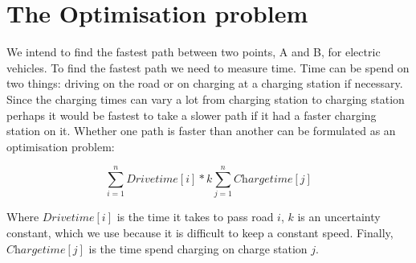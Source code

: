 \section{The Optimisation problem}

We intend to find the fastest path between two points, A and B, for electric vehicles. To find the 
fastest path we need to measure time. Time can be spend on two things: driving on the road or on charging
at a charging station if necessary. Since the charging times can vary a lot from charging station to charging station 
perhaps it would be fastest to take a slower path if it had a faster charging station on it. Whether one path is 
faster than another can be formulated as an optimisation problem:

\[\displaystyle \sum_{i=1}^{n} \textit{Drivetime}[i] * k \displaystyle \sum_{j=1}^{n} \textit{Chargetime}[j]\]

Where $\textit{Drivetime}[i]$ is the time it takes to pass road $i$, $k$ is an uncertainty constant,
which we use because it is difficult to keep a constant speed. Finally, $\textit{Chargetime}[j]$ is the time
spend charging on charge station $j$.

